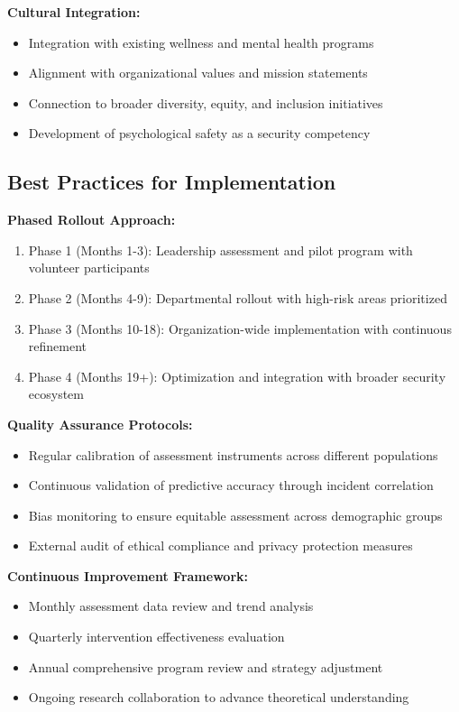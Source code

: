 \documentclass[11pt,a4paper]{article}
\begin{document}
\textbf{Cultural Integration:}
\begin{itemize}
\item Integration with existing wellness and mental health programs
\item Alignment with organizational values and mission statements
\item Connection to broader diversity, equity, and inclusion initiatives
\item Development of psychological safety as a security competency
\end{itemize}

\subsection{Best Practices for Implementation}

\textbf{Phased Rollout Approach:}
\begin{enumerate}
\item Phase 1 (Months 1-3): Leadership assessment and pilot program with volunteer participants
\item Phase 2 (Months 4-9): Departmental rollout with high-risk areas prioritized
\item Phase 3 (Months 10-18): Organization-wide implementation with continuous refinement
\item Phase 4 (Months 19+): Optimization and integration with broader security ecosystem
\end{enumerate}

\textbf{Quality Assurance Protocols:}
\begin{itemize}
\item Regular calibration of assessment instruments across different populations
\item Continuous validation of predictive accuracy through incident correlation
\item Bias monitoring to ensure equitable assessment across demographic groups
\item External audit of ethical compliance and privacy protection measures
\end{itemize}

\textbf{Continuous Improvement Framework:}
\begin{itemize}
\item Monthly assessment data review and trend analysis
\item Quarterly intervention effectiveness evaluation
\item Annual comprehensive program review and strategy adjustment
\item Ongoing research collaboration to advance theoretical understanding
\end{itemize}
\end{document}
